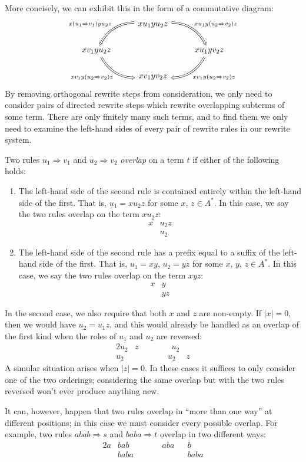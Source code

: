 \documentclass[../generics]{subfiles}
\begin{document}
More concisely, we can exhibit this in the form of a commutative diagram:
\[
\begin{tikzcd}
&xu_1yu_2z\arrow[ld, Rightarrow, "x(u_1\Rightarrow v_1)yu_2z"', bend right]\arrow[rd, Rightarrow, "xu_1y(u_2\Rightarrow v_2)z", bend left]\\
xv_1yu_2z\arrow[rd, Rightarrow, "xv_1y(u_2\Rightarrow v_2)z"', bend right]&&xu_1yv_2z\arrow[ld, Rightarrow, "xv_1y(u_2\Rightarrow v_2)z", bend left]\\
&xv_1yv_2z
\end{tikzcd}
\]
By removing orthogonal rewrite steps from consideration, we only need to consider pairs of directed rewrite steps which rewrite overlapping subterms of some term. There are only finitely many such terms, and to find them we only need to examine the left-hand sides of every pair of rewrite rules in our rewrite system.
\begin{definition}\label{overlappingrules}
Two rules $u_1\Rightarrow v_1$ and $u_2\Rightarrow v_2$ \emph{overlap} on a term $t$ if either of the following holds:
\begin{enumerate}
\item The left-hand side of the second rule is contained entirely within the left-hand side of the first. That is, $u_1=xu_2z$ for some $x$, $z\in A^*$. In this case, we say the two rules overlap on the term $xu_2z$:
\begin{align*}
x&u_2z\\
&u_2
\end{align*}
\item The left-hand side of the second rule has a prefix equal to a suffix of the left-hand side of the first. That is, $u_1=xy$, $u_2=yz$ for some $x$, $y$, $z\in A^*$. In this case, we say the two rules overlap on the term $xyz$:
\begin{align*}
x&y\\
&yz
\end{align*}
\end{enumerate}
In the second case, we also require that both $x$ and $z$ are non-empty. If $|x|=0$, then we would have $u_2=u_1z$, and this would already be handled as an overlap of the first kind when the roles of $u_1$ and $u_2$ are reversed:
\begin{alignat*}{2}
u_2&z\qquad\qquad u_2\\
u_2&\qquad\qquad u_2&z
\end{alignat*}
A simular situation arises when $|z|=0$. In these cases it suffices to only consider one of the two orderings; considering the same overlap but with the two rules reversed won't ever produce anything new.

It can, however, happen that two rules overlap in ``more than one way'' at different positions; in this case we must consider every possible overlap. For example, two rules $abab\Rightarrow s$ and $baba\Rightarrow t$ overlap in two different ways:
\begin{alignat*}{2}
a&bab\qquad\qquad aba&&b\\
&baba\qquad\qquad &&baba
\end{alignat*}
\end{definition}
\end{document}
